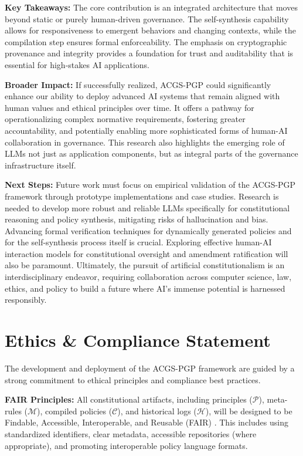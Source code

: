 \documentclass[sigconf,review,screen]{acmart}
\begin{document}
\textbf{Key Takeaways:} The core contribution is an integrated architecture that moves beyond static or purely human-driven governance. The self-synthesis capability allows for responsiveness to emergent behaviors and changing contexts, while the compilation step ensures formal enforceability. The emphasis on cryptographic provenance and integrity provides a foundation for trust and auditability that is essential for high-stakes AI applications.

\textbf{Broader Impact:} If successfully realized, ACGS-PGP could significantly enhance our ability to deploy advanced AI systems that remain aligned with human values and ethical principles over time. It offers a pathway for operationalizing complex normative requirements, fostering greater accountability, and potentially enabling more sophisticated forms of human-AI collaboration in governance. This research also highlights the emerging role of LLMs not just as application components, but as integral parts of the governance infrastructure itself.

\textbf{Next Steps:} Future work must focus on empirical validation of the ACGS-PGP framework through prototype implementations and case studies. Research is needed to develop more robust and reliable LLMs specifically for constitutional reasoning and policy synthesis, mitigating risks of hallucination and bias. Advancing formal verification techniques for dynamically generated policies and for the self-synthesis process itself is crucial. Exploring effective human-AI interaction models for constitutional oversight and amendment ratification will also be paramount. Ultimately, the pursuit of artificial constitutionalism is an interdisciplinary endeavor, requiring collaboration across computer science, law, ethics, and policy to build a future where AI's immense potential is harnessed responsibly.

\section{Ethics \& Compliance Statement}
The development and deployment of the ACGS-PGP framework are guided by a strong commitment to ethical principles and compliance best practices.

\textbf{FAIR Principles:} All constitutional artifacts, including principles ($\mathcal{P}$), meta-rules ($\mathcal{M}$), compiled policies ($\mathcal{C}$), and historical logs ($\mathcal{H}$), will be designed to be Findable, Accessible, Interoperable, and Reusable (FAIR) \cite{wilkinson2016fair}. This includes using standardized identifiers, clear metadata, accessible repositories (where appropriate), and promoting interoperable policy language formats.
\end{document}
